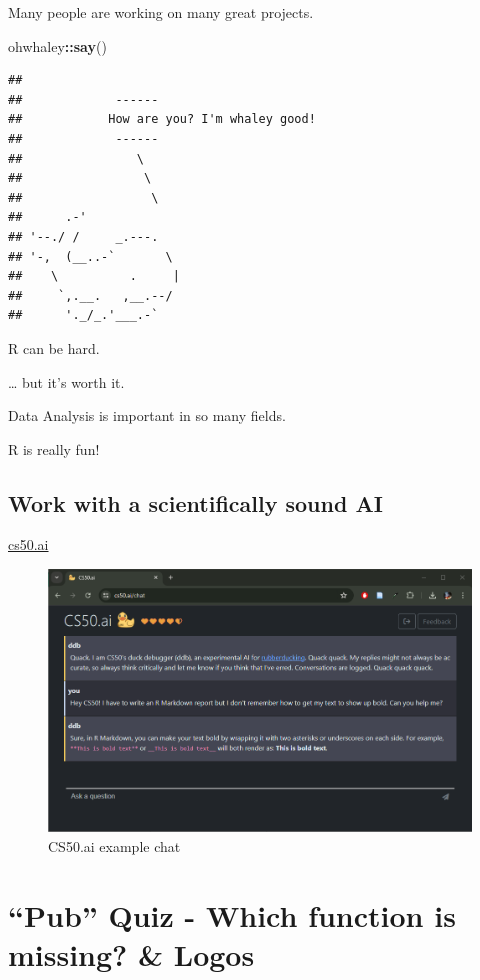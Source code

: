 \documentclass[
]{book}
\newenvironment{Shaded}{\begin{snugshade}}{\end{snugshade}}
\newcommand{\FunctionTok}[1]{\textcolor[rgb]{0.13,0.29,0.53}{\textbf{#1}}}
\newcommand{\NormalTok}[1]{#1}
\newcommand{\SpecialCharTok}[1]{\textcolor[rgb]{0.81,0.36,0.00}{\textbf{#1}}}
\begin{document}
Many people are working on many great projects.

\begin{Shaded}
\begin{Highlighting}[]
\NormalTok{ohwhaley}\SpecialCharTok{::}\FunctionTok{say}\NormalTok{()}
\end{Highlighting}
\end{Shaded}

\begin{verbatim}
## 
##             ------ 
##            How are you? I'm whaley good! 
##             ------ 
##                \   
##                 \  
##                  \
##      .-'
## '--./ /     _.---.
## '-,  (__..-`       \
##    \          .     |
##     `,.__.   ,__.--/
##      '._/_.'___.-`
\end{verbatim}

R can be hard.

\ldots{} but it's worth it.

Data Analysis is important in so many fields.

R is really fun!

\subsection{Work with a scientifically sound AI}\label{work-with-a-scientifically-sound-ai}

\url{cs50.ai}

\begin{figure}
\centering
\includegraphics{./img/cs50ai.png}
\caption{CS50.ai example chat}
\end{figure}

\section{``Pub'' Quiz - Which function is missing? \& Logos}\label{pub-quiz---which-function-is-missing-logos}
\end{document}
